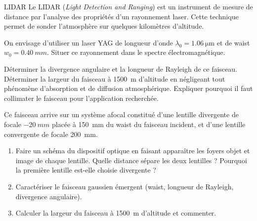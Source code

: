 \begin{exo}[PC][2][TD]{LIDAR}
Le LIDAR (\textit{Light Detection and Ranging}) est un instrument de mesure de distance par l'analyse des propriétés d'un rayonnement laser. Cette technique permet de sonder l'atmosphère sur quelques kilomètres d'altitude.
\begin{quest}
\item On envisage d'utiliser un laser YAG de longueur d'onde $\lambda_0=\SI{1,06}{\micro\meter}$ et de waist $w_0=\SI{0,40}{mm}$. Situer ce rayonnement dans le spectre électromagnétique.
\item Déterminer la divergence angulaire et la longueur de Rayleigh de ce faisceau. Déterminer la largeur du faisceau à \SI{1500}{m} d'altitude en négligeant tout phénomène d'absorption et de diffusion atmosphérique. Expliquer pourquoi il faut collimater le faisceau pour l'application recherchée.
\item Ce faisceau arrive sur un système afocal constitué d'une lentille divergente de focale $-\SI{20}{mm}$ placée à \SI{150}{mm} du waist du faisceau incident, et d'une lentille convergente de focale \SI{200}{mm}.
\begin{enumerate}
\item Faire un schéma du dispositif optique en faisant apparaître les foyers objet et image de chaque lentille. Quelle distance sépare les deux lentilles ? Pourquoi la première lentille est-elle choisie divergente ?
\item Caractériser le faisceau gaussien émergent (waist, longueur de Rayleigh, divergence angulaire).
\item Calculer la largeur du faisceau à \SI{1500}{m} d'altitude et commenter.
\end{enumerate}
\end{quest}
\end{exo}

